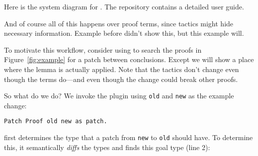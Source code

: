 Here is the system diagram for \sysname.
The \sysname repository contains a detailed user guide.

And of course all of this happens over proof terms, since tactics might hide necessary information.
Example before didn't show this, but this example will.

\begin{figure*}
\begin{minipage}{0.50\textwidth}
\lstset{language=coq, aboveskip=0pt, belowskip=0pt}






\end{minipage}
\hfill
\begin{minipage}{0.48\textwidth}
\lstset{language=coq, aboveskip=0pt, belowskip=0pt}






\end{minipage}
\caption{Two proofs with different conclusions (top) and the
corresponding proof terms (bottom) with relevant type information. We highlight the change in theorem conclusion and
the difference in terms that corresponds to a patch.}
\label{fig:example}
\end{figure*}

To motivate this workflow, consider using \sysname to search the proofs in
Figure~\ref{fig:example} for a patch between conclusions.
Except we will show a place where the lemma is actually applied.
Note that the tactics don't change even though the terms do---and even though the change could break other proofs.

So what do we do?
We invoke the plugin using \lstinline{old} and \lstinline{new} as the example change:

\begin{lstlisting}[language=ml4]
  Patch Proof old new as patch.
\end{lstlisting}
\sysname first determines the type that a patch from \lstinline{new} to \lstinline{old} should have.
To determine this, it semantically \textit{diffs} the types and finds this goal type (line 2):

